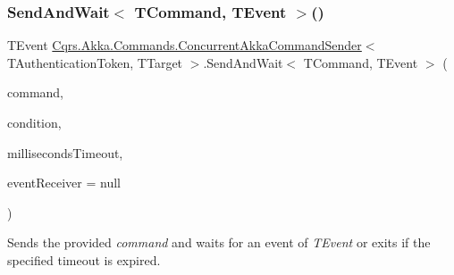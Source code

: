 \subsubsection{\texorpdfstring{Send\+And\+Wait$<$ T\+Command, T\+Event $>$()}{SendAndWait< TCommand, TEvent >()}\hspace{0.1cm}{\footnotesize\ttfamily [5/6]}}
{\footnotesize\ttfamily T\+Event \hyperlink{classCqrs_1_1Akka_1_1Commands_1_1ConcurrentAkkaCommandSender}{Cqrs.\+Akka.\+Commands.\+Concurrent\+Akka\+Command\+Sender}$<$ T\+Authentication\+Token, T\+Target $>$.Send\+And\+Wait$<$ T\+Command, T\+Event $>$ (\begin{DoxyParamCaption}\item[{T\+Command}]{command,  }\item[{Func$<$ I\+Enumerable$<$ \hyperlink{interfaceCqrs_1_1Events_1_1IEvent}{I\+Event}$<$ T\+Authentication\+Token $>$$>$, T\+Event $>$}]{condition,  }\item[{int}]{milliseconds\+Timeout,  }\item[{\hyperlink{interfaceCqrs_1_1Events_1_1IEventReceiver}{I\+Event\+Receiver}$<$ T\+Authentication\+Token $>$}]{event\+Receiver = {\ttfamily null} }\end{DoxyParamCaption})}



Sends the provided {\itshape command}  and waits for an event of {\itshape T\+Event}  or exits if the specified timeout is expired. 


